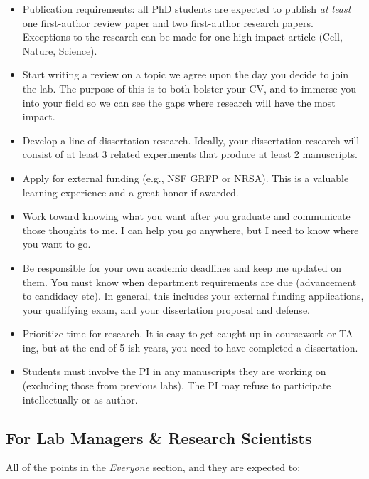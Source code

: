 \documentclass[
]{book}
\providecommand{\tightlist}{%
  \setlength{\itemsep}{0pt}\setlength{\parskip}{0pt}}
\begin{document}
\begin{itemize}
\tightlist
\item
  Publication requirements: all PhD students are expected to publish \emph{at least} one first-author review paper and two first-author research papers. Exceptions to the research can be made for one high impact article (Cell, Nature, Science).
\item
  Start writing a review on a topic we agree upon the day you decide to join the lab. The purpose of this is to both bolster your CV, and to immerse you into your field so we can see the gaps where research will have the most impact.
\item
  Develop a line of dissertation research. Ideally, your dissertation research will consist of at least 3 related experiments that produce at least 2 manuscripts.
\item
  Apply for external funding (e.g., NSF GRFP or NRSA). This is a valuable learning experience and a great honor if awarded.
\item
  Work toward knowing what you want after you graduate and communicate those thoughts to me. I can help you go anywhere, but I need to know where you want to go.
\item
  Be responsible for your own academic deadlines and keep me updated on them. You must know when department requirements are due (advancement to candidacy etc). In general, this includes your external funding applications, your qualifying exam, and your dissertation proposal and defense.
\item
  Prioritize time for research. It is easy to get caught up in coursework or TA-ing, but at the end of 5-ish years, you need to have completed a dissertation.
\item
  Students must involve the PI in any manuscripts they are working on (excluding those from previous labs). The PI may refuse to participate intellectually or as author.
\end{itemize}

\hypertarget{for-lab-managers-research-scientists}{%
\subsection{For Lab Managers \& Research Scientists}\label{for-lab-managers-research-scientists}}

All of the points in the \emph{Everyone} section, and they are expected to:
\end{document}
